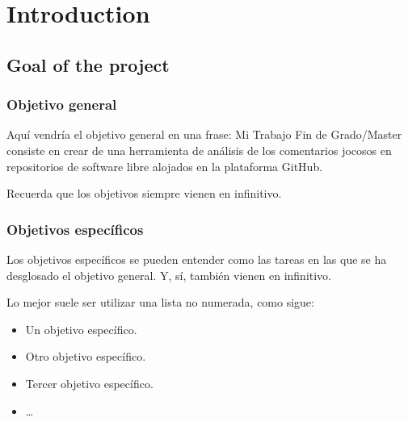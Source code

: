 \cleardoublepage
\chapter{Introduction}
\label{sec:intro}




\section{Goal of the project}
\label{sec:objetivos}

\subsection{Objetivo general} %
\label{sec:objetivo-general} %


Aquí vendría el objetivo general en una frase:
Mi Trabajo Fin de Grado/Master consiste en crear de una herramienta de análisis de los comentarios jocosos en repositorios de software libre alojados en la plataforma GitHub.

Recuerda que los objetivos siempre vienen en infinitivo.


\subsection{Objetivos específicos}
\label{sec:objetivos-especificos}

Los objetivos específicos se pueden entender como las tareas en las que se ha desglosado el objetivo general. Y, sí, también vienen en infinitivo.

Lo mejor suele ser utilizar una lista no numerada, como sigue:

    \begin{itemize}
        \item Un objetivo específico.
        \item Otro objetivo específico.
        \item Tercer objetivo específico.
        \item \ldots
    \end{itemize}

